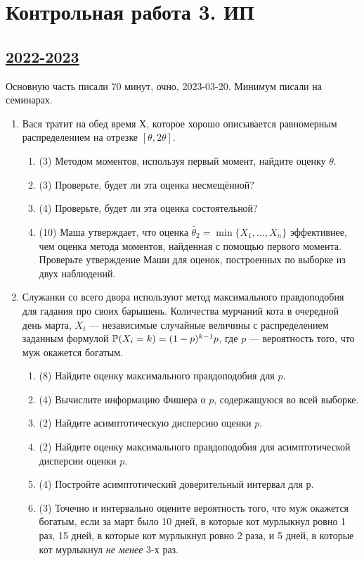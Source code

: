 \newpage
\thispagestyle{empty}
\section{Контрольная работа 3. ИП}

\subsection[2022-2023]{\hyperref[sec:sol_kr_03_ip_2022_2023]{2022-2023}}
\label{sec:kr_03_ip_2022_2023}

Основную часть писали 70 минут, очно, 2023-03-20. Минимум писали на семинарах. 

\begin{enumerate}
  \item Вася тратит на обед время $Х$, которое хорошо описывается равномерным распределением на отрезке $[ \theta, 2 \theta ]$. 

  \begin{enumerate}
  \item (3) Методом моментов, используя первый момент, найдите оценку $\theta$.
  \item (3) Проверьте, будет ли эта оценка несмещённой?
  \item (4) Проверьте, будет ли эта оценка состоятельной?
  \item (10) Маша утверждает, что оценка $\tilde{\theta_2} = \min⁡\{X_1, \ldots, X_n\}$ эффективнее, чем оценка метода моментов, найденная с помощью первого момента. 
  Проверьте утверждение Маши для оценок, построенных по выборке из двух наблюдений.
  \end{enumerate}
  
  \item Служанки со всего двора используют метод максимального правдоподобия для 
  гадания про своих барышень. 
  Количества мурчаний кота в очередной день марта, $X_i$ —
  независимые случайные величины с распределением заданным формулой $\P(X_i = k) = (1-p)^{k-1}p$,
  где $p$ — вероятность того, что муж окажется богатым. 
  
  \begin{enumerate}
  \item  (8) Найдите оценку максимального правдоподобия для $p$.
  \item  (4) Вычислите информацию Фишера о $p$, содержащуюся во всей выборке.
  \item  (2) Найдите асимптотическую дисперсию оценки $p$.
  \item  (2) Найдите оценку максимального правдоподобия для асимптотической дисперсии оценки $p$.
  \item  (4) Постройте асимптотический доверительный интервал для $р$.
  \item  (3) Точечно и интервально оцените вероятность того, что муж окажется богатым, если за март было 10 дней, в которые кот мурлыкнул ровно 1 раз, 15 дней, в которые кот мурлыкнул ровно 2 раза,
  и 5 дней, в которые кот мурлыкнул \textit{не менее} 3-х раз. 
  \end{enumerate}
  

\end{enumerate}
